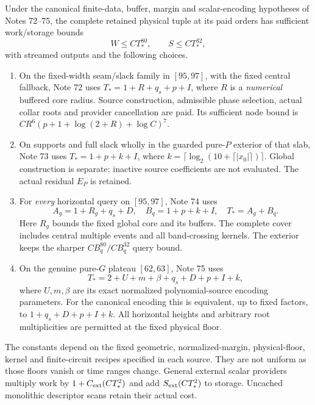 \begin{theorem}
\label{thm:scoped-query-cost}
Under the canonical finite-data, buffer, margin and scalar-encoding
hypotheses of Notes 72--75, the complete retained physical tuple at its
paid orders has sufficient work/storage bounds
\[
 W\le C T_*^{80},\qquad S\le C T_*^{32},
\]
with streamed outputs and the following choices.
\begin{enumerate}[leftmargin=*]
\item On the fixed-width seam/slack family in $[95,97]$, with the fixed
central fallback, Note 72 uses $T_*=1+R+q_s+p+I$, where $R$ is a
\emph{numerical} buffered core radius. Source construction, admissible
phase selection, actual collar roots and provider cancellation are paid.
Its sufficient node bound is $CR^6(p+1+\log(2+R)+\log C)^7$.
\item On supports and full slack wholly in the guarded pure-$P$ exterior
of that slab, Note 73 uses $T_*=1+p+k+I$, where
$k=\lceil\log_2(10+\lceil|x_0|\rceil)\rceil$. Global construction
is separate; inactive source coefficients are not evaluated. The actual
residual $E_P$ is retained.
\item For \emph{every} horizontal query on $[95,97]$, Note 74 uses
\[
 A_g=1+R_g+q_s+D,\quad B_q=1+p+k+I,\quad T_*=A_g+B_q.
\]
Here $R_g$ bounds the fixed global core and its buffers. The complete
cover includes central multiple events and all band-crossing kernels.
The exterior keeps the sharper $CB_q^{80}/CB_q^{32}$ query bound.
\item On the genuine pure-$G$ plateau $[62,63]$, Note 75 uses
\[
 T_*=2+U+m+\beta+q_s+D+p+I+k,
\]
where $U,m,\beta$ are its exact normalized polynomial-source encoding
parameters. For the canonical encoding this is equivalent, up to fixed
factors, to $1+q_s+D+p+I+k$. All horizontal heights and arbitrary root
multiplicities are permitted at the fixed physical floor.
\end{enumerate}
The constants depend on the fixed geometric, normalized-margin,
physical-floor, kernel and finite-circuit recipes specified in each
source. They are not uniform as those floors vanish or time ranges
change. General external scalar providers multiply work by
$1+C_{\rm ext}(CT_*^2)$ and add $S_{\rm ext}(CT_*^2)$ to storage.
Uncached monolithic descriptor scans retain their actual cost.
\end{theorem}

